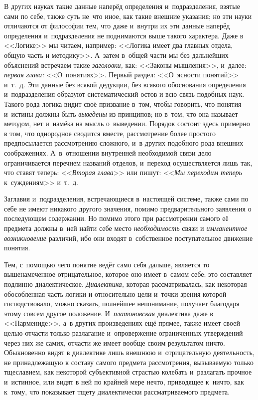 В других науках такие данные наперёд определения и~подразделения, взятые
сами по себе, также суть не~что иное, как такие внешние указания; но эти
науки отличаются от философии тем, что даже и~внутри их эти данные наперёд
определения и~подразделения не поднимаются выше такого характера. Даже в
<<Логике>> мы читаем, например: <<Логика имеет два главных отдела, общую часть
и методику>>. А~затем в~общей части мы без дальнейших объяснений встречаем
такие {\em заголовки,} как: <<Законы мышления>>, и~далее:
{\em первая глава:} <<О~понятиях>>. Первый раздел: <<О~ясности понятий>>
и~т.~д. Эти данные без всякой дедукции, без всякого
обоснования определения и~подразделения образуют систематический остов и
всю связь подобных наук. Такого рода логика видит своё призвание в~том,
чтобы говорить, что понятия и~истины должны быть
{\em выведены} из принципов; но в~том, что она называет
методом, нет и~намёка на мысль о~выведении. Порядок состоит здесь примерно
в том, что однородное сводится вместе, рассмотрение более простого
предпосылается рассмотрению сложного, и~в других подобного рода внешних
соображениях. А~в~отношении внутренней необходимой связи дело
ограничивается перечнем названий отделов, и~переход осуществляется лишь
так, что ставят теперь: <<{\em Вторая глава}>> или пишут:
<<{\em Мы переходим теперь} к~суждениям>> и~т.~д.

Заглавия и~подразделения, встречающиеся в~настоящей системе, также сами по
себе не имеют никакого другого значения, помимо предварительного заявления
о последующем содержании. Но помимо этого при рассмотрении самого её
предмета должны в~ней найти себе место {\em необходимость} связи и
{\em имманентное возникновение} различий, ибо они
входят в~собственное поступательное движение понятия.

Тем, с~помощью чего понятие ведёт само себя дальше, является то
вышенамеченное отрицательное, которое оно имеет в~самом себе; это
составляет подлинно диалектическое. {\em Диалектика,}
которая рассматривалась, как некоторая обособленная часть логики и
относительно цели и~точки зрения которой господствовало, можно сказать,
полнейшее непонимание, получает благодаря этому совсем другое положение.
И~{\em платоновская} диалектика даже в <<Пармениде>>, а~в
других произведениях ещё прямее, также имеет своей целью отчасти только
разлагание и~опровержение ограниченных утверждений через них же самих,
отчасти же имеет вообще своим результатом ничто. Обыкновенно видят в
диалектике лишь внешнюю и~отрицательную деятельность, не принадлежащую к
составу
самого предмета рассмотрения, вызываемую только тщеславием, как некоторой
субъективной страстью колебать и~разлагать прочное и~истинное, или видят в
ней по крайней мере нечто, приводящее к~ничто, как к~тому, что показывает
тщету диалектически рассматриваемого предмета.

